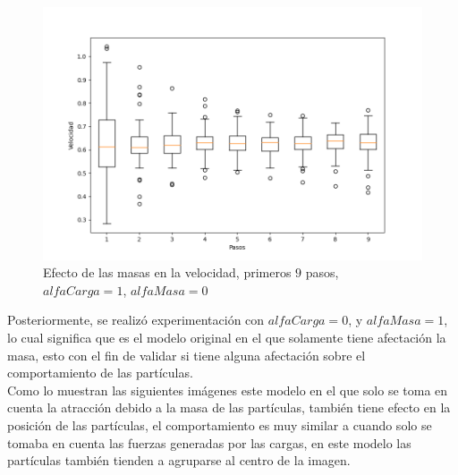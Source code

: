 \documentclass{article}
\begin{document}
		
	\begin{figure}[h!]
		\centering
		\includegraphics[width=0.8\linewidth]{bx_1.png}
		\caption{Efecto de las masas en la velocidad, primeros $9$ pasos, $alfaCarga=1$, $alfaMasa=0$}
		\label{fig:bx1}
		\end{figure}
	\newpage
	Posteriormente,  se realizó experimentación con $alfaCarga = 0$, y $alfaMasa = 1$,  lo cual significa que es el modelo original en el que solamente tiene afectación la masa, esto con el fin de validar si tiene alguna afectación sobre el comportamiento de las partículas. \\
	
	Como lo muestran las siguientes imágenes este modelo en el que solo se toma en cuenta la atracción debido a la masa de las partículas, también tiene efecto en la posición de las partículas, el comportamiento es muy similar a cuando solo se tomaba en cuenta las fuerzas generadas por las cargas, en este modelo las partículas también tienden a agruparse al centro de la imagen.
	
\end{document}
